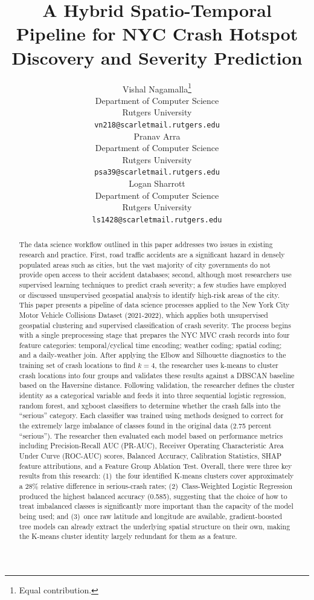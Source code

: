 \documentclass{article}
\title{A Hybrid Spatio-Temporal Pipeline for NYC Crash Hotspot Discovery and Severity Prediction}
\author{%
  Vishal Nagamalla\thanks{Equal contribution.} \\
  Department of Computer Science\\
  Rutgers University\\
  \texttt{vn218@scarletmail.rutgers.edu} \\
  \And
  Pranav Arra\footnotemark[1] \\
  Department of Computer Science\\
  Rutgers University\\
  \texttt{psa39@scarletmail.rutgers.edu} \\
  \And
  Logan Sharrott\footnotemark[1] \\
  Department of Computer Science\\
  Rutgers University\\
  \texttt{ls1428@scarletmail.rutgers.edu} \\
}
\begin{document}
\maketitle
\vspace{-1.5em}

\begin{abstract}
The data science workflow outlined in this paper addresses two issues in
existing research and practice. First, road traffic accidents are a
significant hazard in densely populated areas such as cities, but the vast
majority of city governments do not provide open access to their accident
databases; second, although most researchers use supervised learning
techniques to predict crash severity; a few studies have employed or
discussed unsupervised geospatial analysis to identify high-risk areas of
the city. This paper presents a pipeline of data science processes applied
to the New York City Motor Vehicle Collisions Dataset (2021-2022), which
applies both unsupervised geospatial clustering and supervised classification
of crash severity. The process begins with a single preprocessing stage that
prepares the NYC MVC crash records into four feature categories:
temporal/cyclical time encoding; weather coding; spatial coding; and a
daily-weather join. After applying the Elbow and Silhouette diagnostics to
the training set of crash locations to find $k = 4$, the researcher uses
k-means to cluster crash locations into four groups and validates these
results against a DBSCAN baseline based on the Haversine distance. Following
validation, the researcher defines the cluster identity as a categorical
variable and feeds it into three sequential logistic regression, random
forest, and xgboost classifiers to determine whether the crash falls into
the ``serious'' category. Each classifier was trained using methods designed
to correct for the extremely large imbalance of classes found in the
original data (2.75 percent ``serious''). The researcher then evaluated each
model based on performance metrics including Precision-Recall AUC (PR-AUC),
Receiver Operating Characteristic Area Under Curve (ROC-AUC) scores,
Balanced Accuracy, Calibration Statistics, SHAP feature attributions, and a
Feature Group Ablation Test. Overall, there were three key results from this
research: (1)~the four identified K-means clusters cover approximately a
28\% relative difference in serious-crash rates; (2)~Class-Weighted Logistic
Regression produced the highest balanced accuracy (0.585), suggesting that
the choice of how to treat imbalanced classes is significantly more
important than the capacity of the model being used; and (3)~once raw
latitude and longitude are available, gradient-boosted tree models can
already extract the underlying spatial structure on their own, making the
K-means cluster identity largely redundant for them as a feature.
\end{abstract}
\end{document}
